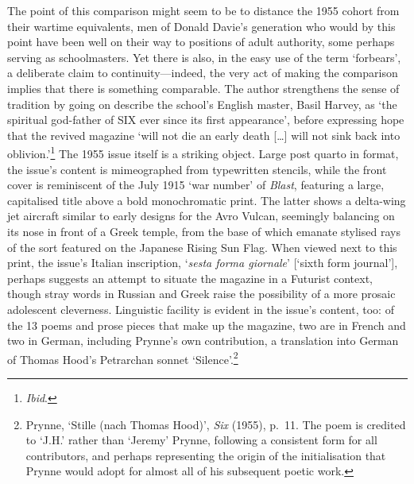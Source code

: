 \documentclass[]{article}
\begin{document}
\noindent The point of this comparison might seem to be to distance the
1955 cohort from their wartime equivalents, men of Donald Davie’s
generation who would by this point have been well on their way to
positions of adult authority, some perhaps serving as schoolmasters. Yet
there is also, in the easy use of the term ‘forbears’, a deliberate
claim to continuity—indeed, the very act of making the comparison
implies that there is something comparable. The author strengthens the
sense of tradition by going on describe the school’s English master,
Basil Harvey, as ‘the spiritual god-father of SIX ever since its first
appearance’, before expressing hope that the revived magazine ‘will not
die an early death {[}\ldots{}{]} will not sink back into
oblivion.’\footnote{\emph{Ibid}.} The 1955 issue itself is a striking
object. Large post quarto in format, the issue’s content is mimeographed
from typewritten stencils, while the front cover is reminiscent of the
July 1915 ‘war number’ of \emph{Blast}, featuring a large, capitalised
title above a bold monochromatic print. The latter shows a delta-wing
jet aircraft similar to early designs for the Avro Vulcan, seemingly
balancing on its nose in front of a Greek temple, from the base of which
emanate stylised rays of the sort featured on the Japanese Rising Sun
Flag. When viewed next to this print, the issue’s Italian inscription,
‘\emph{sesta forma giornale}’ {[}‘sixth form journal’{]}, perhaps
suggests an attempt to situate the magazine in a Futurist context,
though stray words in Russian and Greek raise the possibility of a more
prosaic adolescent cleverness. Linguistic facility is evident in the
issue’s content, too: of the 13 poems and prose pieces that make up the
magazine, two are in French and two in German, including Prynne’s own
contribution, a translation into German of Thomas Hood’s Petrarchan
sonnet ‘Silence’.\footnote{Prynne, ‘Stille (nach Thomas Hood)’,
  \emph{Six} (1955), p.~11. The poem is credited to ‘J.H.’ rather than
  ‘Jeremy’ Prynne, following a consistent form for all contributors, and
  perhaps representing the origin of the initialisation that Prynne
  would adopt for almost all of his subsequent poetic work.}
\end{document}
